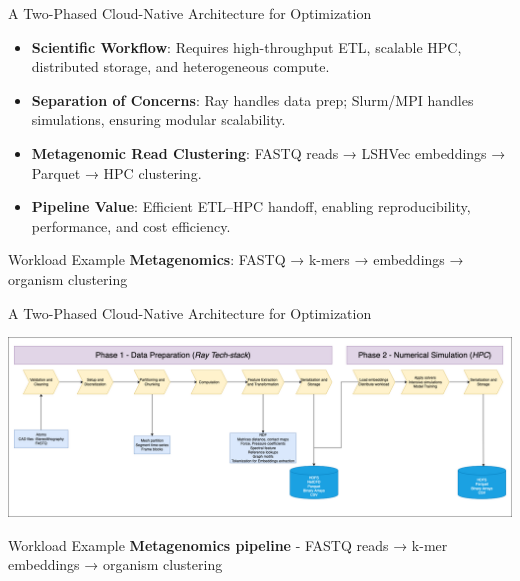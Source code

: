 \documentclass[aspectratio=169]{beamer}
\begin{document}
\begin{frame}{A Two-Phased Cloud-Native Architecture for Optimization}
    \begin{itemize}
        \item \textbf{Scientific Workflow}: Requires high-throughput ETL, scalable HPC, distributed storage, and heterogeneous compute.
        \item \textbf{Separation of Concerns}: Ray handles data prep; Slurm/MPI handles simulations, ensuring modular scalability.
        \item \textbf{Metagenomic Read Clustering}: FASTQ reads → LSHVec embeddings → Parquet → HPC clustering.
        \item \textbf{Pipeline Value}: Efficient ETL–HPC handoff, enabling reproducibility, performance, and cost efficiency.
    \end{itemize}
        
    \vspace{0.3cm}
    \begin{block}{Workload Example}
        \textbf{Metagenomics}: FASTQ → k-mers → embeddings → organism clustering
    \end{block}
\end{frame}


\begin{frame}{A Two-Phased Cloud-Native Architecture for Optimization}
        \vspace{0.4cm}
    
    \begin{center}
        \includegraphics[width=1\textwidth,height=0.6\textheight,keepaspectratio]{../../images/Generalized_data-pipeline.drawio.png}
    \end{center}
        
    \vspace{0.3cm}
    \begin{block}{Workload Example}
        \textbf{Metagenomics pipeline}  - FASTQ reads → k-mer embeddings → organism clustering
    \end{block}
\end{frame}
\end{document}
